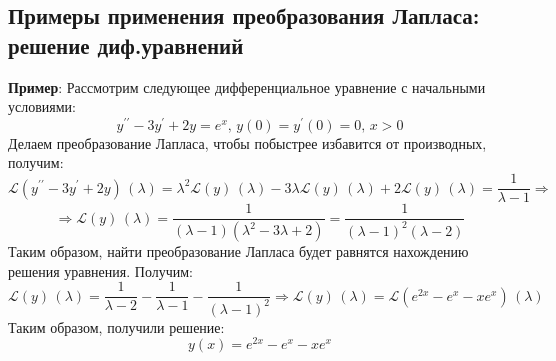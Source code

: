 \documentclass[12pt]{article}
\newcommand{\ML}{\mathcal{L}}
\theoremstyle{definition}
\begin{document}
\subsection*{Примеры применения преобразования Лапласа: решение диф.уравнений}
\textbf{Пример}: Рассмотрим следующее дифференциальное уравнение с начальными условиями:
$$
	y^{\prime\prime} - 3y^\prime + 2y = e^x, \, y(0) = y^\prime(0) = 0, \, x > 0
$$
Делаем преобразование  Лапласа, чтобы побыстрее избавится от производных, получим:
$$
	\ML(y^{\prime\prime} - 3y^\prime + 2y)\, (\lambda) = \lambda^2 \ML(y)\, (\lambda) - 3\lambda\ML(y)\, (\lambda) + 2 \ML(y)\, (\lambda) = \dfrac{1}{\lambda - 1} \Rightarrow 
$$
$$
	\Rightarrow
	\ML(y)\, (\lambda) = \dfrac{1}{(\lambda - 1)(\lambda^2 - 3\lambda + 2)} = \dfrac{1}{(\lambda - 1)^2(\lambda - 2)}
$$
Таким образом, найти преобразование Лапласа будет равнятся нахождению решения уравнения. Получим:
$$
	\ML(y)\,(\lambda) =\dfrac{1}{\lambda - 2} - \dfrac{1}{\lambda - 1} - \dfrac{1}{(\lambda-1)^2} \Rightarrow \ML(y)\,(\lambda) = \ML\left(e^{2x} - e^x - xe^{x}\right)\, (\lambda)
$$
Таким образом, получили решение:
$$
	y(x) = e^{2x} - e^x - xe^{x}
$$
\end{document}
